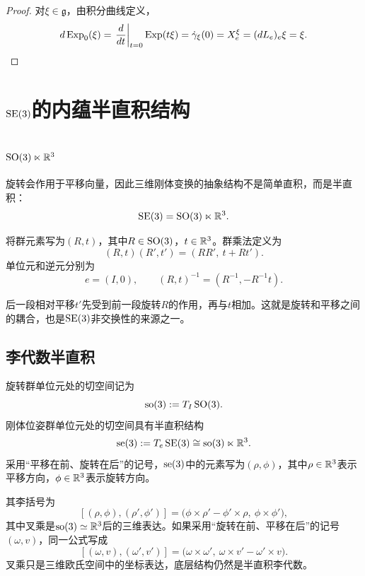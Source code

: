 \begin{proof}
对$\xi\in\mathfrak g$，由积分曲线定义，
\[
    d\operatorname{Exp}_0(\xi)
    =\left.\frac{d}{dt}\right|_{t=0}\operatorname{Exp}(t\xi)
    =\dot\gamma_\xi(0)
    =X^\xi_e
    =(dL_e)_e\xi=\xi.
\]
\end{proof}


\section{$\operatorname{SE}(3)$的内蕴半直积结构}

\subsection{$\operatorname{SO}(3)\ltimes\mathbb{R}^3$}

旋转会作用于平移向量，因此三维刚体变换的抽象结构不是简单直积，而是半直积：
\[
    \operatorname{SE}(3)=\operatorname{SO}(3)\ltimes\mathbb{R}^3.
\]

\begin{definition}[半直积群结构]
将群元素写为$(R,t)$，其中$R\in\operatorname{SO}(3)$，$t\in\mathbb{R}^3$。群乘法定义为
\[
    (R,t)(R',t')=(RR',\ t+Rt').
\]
单位元和逆元分别为
\[
    e=(I,0),
    \qquad
    (R,t)^{-1}=(R^{-1},-R^{-1}t).
\]
\end{definition}

后一段相对平移$t'$先受到前一段旋转$R$的作用，再与$t$相加。这就是旋转和平移之间的耦合，也是$\operatorname{SE}(3)$非交换性的来源之一。

\subsection{李代数半直积}

\begin{definition}[$\so(3)$与$\se(3)$的抽象结构]
旋转群单位元处的切空间记为
\[
    \operatorname{so}(3):=T_I\operatorname{SO}(3).
\]
刚体位姿群单位元处的切空间具有半直积结构
\[
    \operatorname{se}(3):=T_e\operatorname{SE}(3)\cong\operatorname{so}(3)\ltimes\mathbb{R}^3.
\]
采用“平移在前、旋转在后”的记号，$\se(3)$中的元素写为$(\rho,\phi)$，其中$\rho\in\mathbb{R}^3$表示平移方向，$\phi\in\mathbb{R}^3$表示旋转方向。
\end{definition}

其李括号为
\[
    [(\rho,\phi),(\rho',\phi')]
    =\bigl(\phi\times\rho'-\phi'\times\rho,\ \phi\times\phi'\bigr),
\]
其中叉乘是$\operatorname{so}(3)\simeq\mathbb{R}^3$后的三维表达。如果采用“旋转在前、平移在后”的记号$(\omega,v)$，同一公式写成
\[
    [(\omega,v),(\omega',v')]
    =\bigl(\omega\times\omega',\ \omega\times v'-\omega'\times v\bigr).
\]
叉乘只是三维欧氏空间中的坐标表达，底层结构仍然是半直积李代数。

